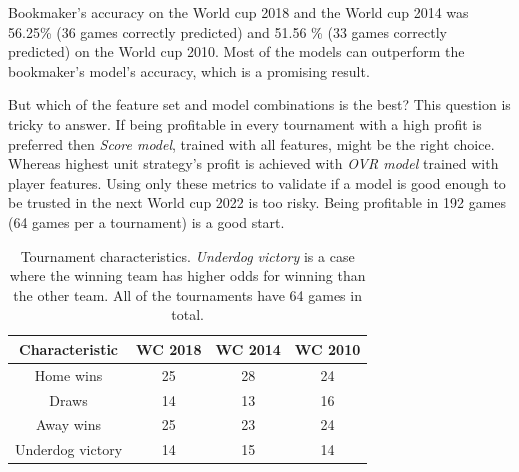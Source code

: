 Bookmaker's accuracy on the World cup 2018 and the World cup 2014 was 56.25\% (36 games correctly predicted) and 51.56  \% (33 games correctly predicted) on the World cup 2010. Most of the models can outperform the bookmaker's model's accuracy, which is a promising result.

But which of the feature set and model combinations is the best? This question is tricky to answer. If being profitable in every tournament with a high profit is preferred then \textit{Score model}, trained with all features, might be the right choice. Whereas highest unit strategy's profit is achieved with \textit{OVR model} trained with player features. Using only these metrics to validate if a model is good enough to be trusted in the next World cup 2022 is too risky. Being profitable in 192 games (64 games per a tournament) is a good start.

\begin{table}
    \caption{Tournament characteristics. \textit{Underdog victory} is a case where the winning team has higher odds for winning than the other team. All of the tournaments have 64 games in total.}
    \begin{tabular}{| c | c|c | c|}
        \hline
        Characteristic & \textbf{WC 2018} & \textbf{WC 2014} & \textbf{WC 2010}\\
        \hline
        Home wins & 25 & 28 & 24\\
        Draws & 14 & 13 & 16\\
        Away wins & 25 & 23 & 24\\
        Underdog victory  & 14 & 15 & 14\\
        \hline
    \end{tabular}
    \label{table:tournamentcharacteristics}
\end{table}



